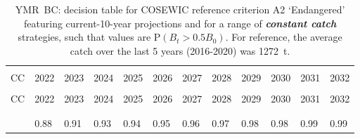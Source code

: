 \documentclass[11pt]{book}
\newcommand{\itbf}[1]{\textit{\textbf{#1}}}
\begin{document}
\begin{longtable}[c]{>{\raggedright\let\newline\\\arraybackslash\hspace{0pt}}p{0.5in}>{\raggedleft\let\newline\\\arraybackslash\hspace{0pt}}p{0.5in}>{\raggedleft\let\newline\\\arraybackslash\hspace{0pt}}p{0.5in}>{\raggedleft\let\newline\\\arraybackslash\hspace{0pt}}p{0.5in}>{\raggedleft\let\newline\\\arraybackslash\hspace{0pt}}p{0.5in}>{\raggedleft\let\newline\\\arraybackslash\hspace{0pt}}p{0.5in}>{\raggedleft\let\newline\\\arraybackslash\hspace{0pt}}p{0.5in}>{\raggedleft\let\newline\\\arraybackslash\hspace{0pt}}p{0.5in}>{\raggedleft\let\newline\\\arraybackslash\hspace{0pt}}p{0.5in}>{\raggedleft\let\newline\\\arraybackslash\hspace{0pt}}p{0.5in}>{\raggedleft\let\newline\\\arraybackslash\hspace{0pt}}p{0.5in}>{\raggedleft\let\newline\\\arraybackslash\hspace{0pt}}p{0.5in}}
  \caption{YMR~BC: decision table for COSEWIC reference criterion A2 `Endangered' featuring current-10-year projections and for a range of \itbf{constant catch} strategies, such that values are P$(B_t > 0.5 B_0)$. For reference, the average catch over the last 5 years (2016-2020) was 1272~t. } \label{tab:ymr.cosewic.50B0.CCs}\\  \hline\\[-2.2ex]  CC  & 2022 & 2023 & 2024 & 2025 & 2026 & 2027 & 2028 & 2029 & 2030 & 2031 & 2032 \\[0.2ex]\hline\\[-1.5ex]  \endfirsthead   \hline  CC  & 2022 & 2023 & 2024 & 2025 & 2026 & 2027 & 2028 & 2029 & 2030 & 2031 & 2032 \\[0.2ex]\hline\\[-1.5ex]  \endhead  \hline\\[-2.2ex]   \endfoot  \hline \endlastfoot  0 & 0.88 & 0.91 & 0.93 & 0.94 & 0.95 & 0.96 & 0.97 & 0.98 & 0.98 & 0.99 & 0.99 \\ 

\end{longtable}
\end{document}
